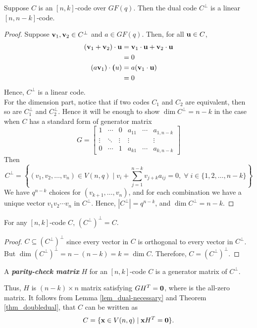 \documentclass[../main.tex]{subfiles}
\begin{document}
\begin{thm}
	Suppose $C$ is an $[n,k]$-code over $GF(q)$. Then the dual code $C^\perp$ is a linear $[n,n-k]$-code.
\end{thm}

\begin{proof}
	Suppose $\textbf{v}_1, \textbf{v}_2\in C^\perp$ and $a\in GF(q)$. Then, for all $\textbf{u}\in C$,
	\begin{align*}
		(\textbf{v}_1+\textbf{v}_2)\cdot \textbf{u} &= \textbf{v}_1\cdot \textbf{u} +\textbf{v}_2\cdot \textbf{u}\\
		&= 0\\
		(a\textbf{v}_1)\cdot \textbf{(}u) &= a(\textbf{v}_1\cdot \textbf{u})\\
		&=0
	\end{align*}
	Hence, $C^{\perp}$ is a linear code.	\\
	For the dimension part, notice that if two codes $C_1$ and $C_2$ are equivalent, then so are $C_1^\perp$ and $C_2^\perp$. Hence it will be enough to show $\dim{C^\perp} = n-k$ in the case when $C$ has a standard form of generator matrix
	\[
		G = \begin{bmatrix}
			1 & \cdots  & 0 & a_{11} & \cdots & a_{1,n-k}\\
			\vdots & \ddots & \vdots & \vdots & & \vdots\\
			0 & \cdots & 1 & a_{k1} & \cdots & a_{k,n-k}
		\end{bmatrix}
	\]
	Then
	\[
		C^\perp = \left\{(v_1,v_2,\ldots,v_n)\in V(n,q) \;|\; v_i + \displaystyle\sum_{j=1}^{n-k}v_{j+k}a_{ij} = 0, \;\forall\; i \in \{1,2,\ldots,n-k\}\right\} 
	\]
	We have $q^{n-k}$ choices for $(v_{k+1},\ldots,v_n)$, and for each combination we have a unique vector $v_1v_2\cdots v_n$ in $C^\perp$. Hence, $|C^{\perp}|=q^{n-k}$, and $\dim{C^\perp}=n-k$. 
\end{proof}

\begin{thm}\label{thm_doubledual}
	For any $[n,k]$-code $C$, $(C^\perp)^\perp= C$.
\end{thm}
\begin{proof}
	$C\subseteq (C^\perp)^\perp$ since every vector in $C$ is orthogonal to every vector in $C^\perp$. But $\dim{(C^\perp)^\perp}= n-(n-k)=k=\dim{C}$. Therefore, $C = (C^\perp)^\perp$.
\end{proof}

\begin{defn}
	A \textbf{\emph{parity-check matrix}} $H$ for an $[n,k]$-code $C$ is a generator matrix of $C^\perp$.
\end{defn}
Thus, $H$ is $(n-k)\times n$ matrix satisfying $GH^T=\textbf{0}$, where  is the all-zero matrix. It follows from Lemma \ref{lem_dual-necessary} and Theorem \ref{thm_doubledual}, that $C$ can be written as
\[
	C = \{\textbf{x}\in V(n,q) \;|\; \textbf{x}H^T = \textbf{0}\}.
\] 
\end{document}
